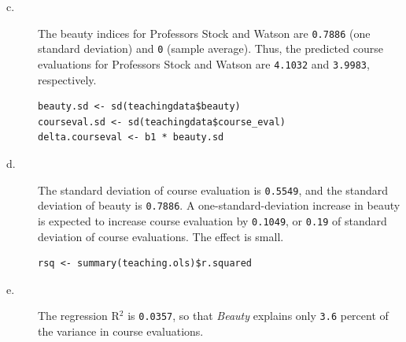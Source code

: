 \documentclass[a4paper,11pt]{article}
\begin{document}
\begin{description}
\item[{c.}] The beauty indices for Professors Stock and Watson are
\texttt{0.7886} (one standard deviation)
and \texttt{0} (sample average).
Thus, the predicted course evaluations for Professors
Stock and Watson are \texttt{4.1032} and
\texttt{3.9983}, respectively.

\begin{verbatim}
beauty.sd <- sd(teachingdata$beauty)
courseval.sd <- sd(teachingdata$course_eval)
delta.courseval <- b1 * beauty.sd
\end{verbatim}

\item[{d.}] The standard deviation of course evaluation is
\texttt{0.5549}, and the standard deviation of
beauty is \texttt{0.7886}. A one-standard-deviation
increase in beauty is expected to increase course evaluation
by \texttt{0.1049}, or
\texttt{0.19} of standard deviation of course
evaluations. The effect is small.

\begin{verbatim}
rsq <- summary(teaching.ols)$r.squared
\end{verbatim}

\item[{e.}] The regression R\(^{\text{2}}\) is \texttt{0.0357}, so that \emph{Beauty}
explains only \texttt{3.6} percent of the
variance in course evaluations.
\end{description}
\end{document}
